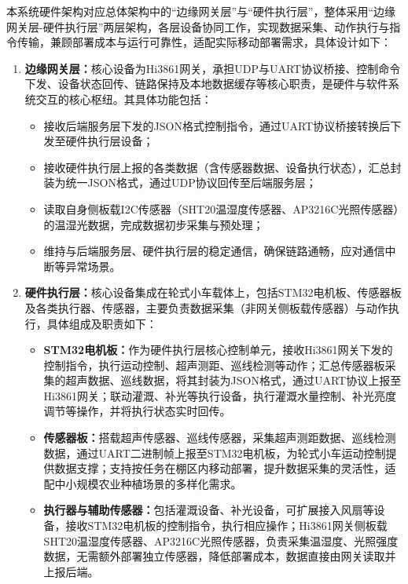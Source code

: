 \documentclass{article}
\begin{document}
本系统硬件架构对应总体架构中的“边缘网关层”与“硬件执行层”，整体采用“边缘网关层-硬件执行层”两层架构，各层设备协同工作，实现数据采集、动作执行与指令传输，兼顾部署成本与运行可靠性，适配实际移动部署需求，具体设计如下：
\begin{enumerate}[leftmargin=2em,itemsep=0.2em,topsep=0.2em]

    \item \textbf{边缘网关层：}核心设备为Hi3861网关，承担UDP与UART协议桥接、控制命令下发、设备状态回传、链路保持及本地数据缓存等核心职责，是硬件与软件系统交互的核心枢纽。其具体功能包括：

    \begin{itemize}[leftmargin=2em,itemsep=0.2em,topsep=0.2em]
        \item 接收后端服务层下发的JSON格式控制指令，通过UART协议桥接转换后下发至硬件执行层设备；
        \item 接收硬件执行层上报的各类数据（含传感器数据、设备执行状态），汇总封装为统一JSON格式，通过UDP协议回传至后端服务层；
        \item 读取自身侧板载I2C传感器（SHT20温湿度传感器、AP3216C光照传感器）的温湿光数据，完成数据初步采集与预处理；
        \item 维持与后端服务层、硬件执行层的稳定通信，确保链路通畅，应对通信中断等异常场景。
    \end{itemize}
    
    
    \item \textbf{硬件执行层：}核心设备集成在轮式小车载体上，包括STM32电机板、传感器板及各类执行器、传感器，主要负责数据采集（非网关侧板载传感器）与动作执行，具体组成及职责如下：

    \begin{itemize}[leftmargin=2em,itemsep=0.2em,topsep=0.2em]
        \item \textbf{STM32电机板：}作为硬件执行层核心控制单元，接收Hi3861网关下发的控制指令，执行运动控制、超声测距、巡线检测等动作；汇总传感器板采集的超声数据、巡线数据，将其封装为JSON格式，通过UART协议上报至Hi3861网关；联动灌溉、补光等执行设备，执行灌溉水量控制、补光亮度调节等操作，并将执行状态实时回传。

        \item \textbf{传感器板：}搭载超声传感器、巡线传感器，采集超声测距数据、巡线检测数据，通过UART二进制帧上报至STM32电机板，为轮式小车运动控制提供数据支撑；支持按任务在棚区内移动部署，提升数据采集的灵活性，适配中小规模农业种植场景的多样化需求。

        \item  \textbf{执行器与辅助传感器：}包括灌溉设备、补光设备，可扩展接入风扇等设备，接收STM32电机板的控制指令，执行相应操作；Hi3861网关侧板载SHT20温湿度传感器、AP3216C光照传感器，负责采集温湿度、光照强度数据，无需额外部署独立传感器，降低部署成本，数据直接由网关读取并上报后端。
    \end{itemize}
    
\end{enumerate}
\end{document}
